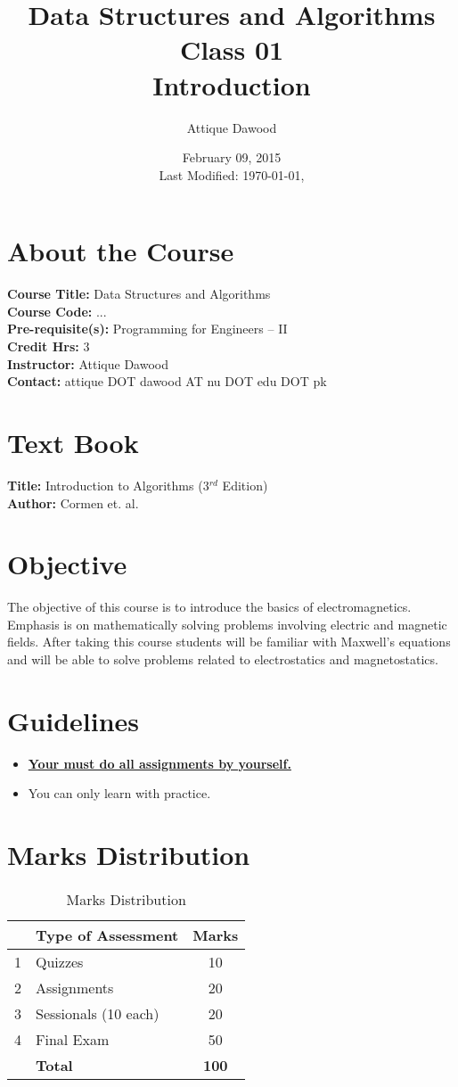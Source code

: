 \documentclass[12pt,a4paper]{article}
\title{Data Structures and Algorithms\\Class 01\\Introduction}
\author{Attique Dawood}
\date{February 09, 2015\\[0.2cm] Last Modified: \today, \currenttime}
\begin{document}
\maketitle
\section{About the Course}
\textbf{Course Title:} Data Structures and Algorithms\\
\textbf{Course Code:} ...\\
\textbf{Pre-requisite(s):} Programming for Engineers -- II\\
\textbf{Credit Hrs:} 3\\
\textbf{Instructor:} Attique Dawood\\
\textbf{Contact:} attique DOT dawood AT nu DOT edu DOT pk\\
\section{Text Book}
\textbf{Title:} Introduction to Algorithms (3$^{rd}$ Edition)\\
\textbf{Author:} Cormen et. al.\\
\section{Objective}
The objective of this course is to introduce the basics of electromagnetics. Emphasis is on mathematically solving problems involving electric and magnetic fields. After taking this course students will be familiar with Maxwell's equations and will be able to solve problems related to electrostatics and magnetostatics.
\section{Guidelines}
\begin{itemize}
\item \textbf{\underline{Your must do all assignments by yourself.}}
\item You can only learn with practice.
\end{itemize}
\section{Marks Distribution}
\begin{table}[H]
\begin{center}
\vspace{0.3cm}
	\begin{tabular}{llc}
	\hline \hline
		\rule{0pt}{2.6ex} & \textbf{Type of Assessment} & \textbf{Marks}\\
		\hline
		1 \rule{0pt}{2.6ex} & Quizzes & 10\\
		2 & Assignments& 20\\
		3 & Sessionals (10 each) & 20\\
		4 & Final Exam & 50\\
	\hline \hline
	\rule{0pt}{2.6ex} & \textbf{Total} & \textbf{100}\\
	\hline \hline
	\end{tabular}
\end{center}
\label{Marks Distribution}
\caption{Marks Distribution}
\end{table}
\end{document}
